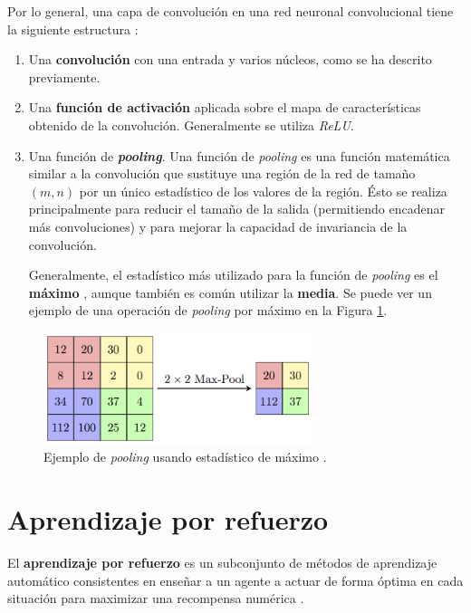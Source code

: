Por lo general, una capa de convolución en una red neuronal convolucional tiene la siguiente estructura \cite{Goodfellow-et-al-2016}: 
\begin{enumerate}
	\item Una \textbf{convolución} con una entrada y varios núcleos, como se ha descrito previamente.
	\item Una \textbf{función de activación} aplicada sobre el mapa de características obtenido de la convolución. Generalmente se utiliza \textit{ReLU}.
	\item Una función de \textbf{\textit{pooling}}. Una función de \textit{pooling} es una función matemática similar a la convolución que sustituye una región de la red de tamaño $(m,n)$ por un único estadístico de los valores de la región. Ésto se realiza principalmente para reducir el tamaño de la salida (permitiendo encadenar más convoluciones) y para mejorar la capacidad de invariancia de la convolución.
	
	Generalmente, el estadístico más utilizado para la función de \textit{pooling} es el \textbf{máximo} \cite{Zhou1988ComputationOO}, aunque también es común utilizar la \textbf{media}. Se puede ver un ejemplo de una operación de \textit{pooling} por máximo en la Figura \ref{fig:chap3-pool}.
\end{enumerate}

\begin{figure}[h]
    \centering
    \includegraphics[width=0.7\textwidth]{imagenes/cap3/pooling.png}
    \caption{Ejemplo de \textit{pooling} usando estadístico de máximo \cite{cswiki18}.}
    \label{fig:chap3-pool}
\end{figure}




\section{Aprendizaje por refuerzo}

El \textbf{aprendizaje por refuerzo} es un subconjunto de métodos de aprendizaje automático consistentes en enseñar a un agente a actuar de forma óptima en cada situación para maximizar una recompensa numérica \cite{Sutton1998}.


